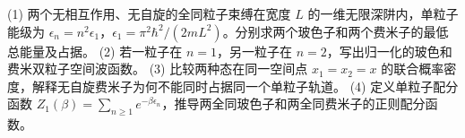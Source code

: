(1) 两个无相互作用、无自旋的全同粒子束缚在宽度 \(L\) 的一维无限深阱内，单粒子能级为 \(\epsilon_n=n^2\epsilon_1\)，\(\epsilon_1=\pi^2\hbar^2/(2mL^2)\)。分别求两个玻色子和两个费米子的最低总能量及占据。
(2) 若一粒子在 \(n=1\)，另一粒子在 \(n=2\)，写出归一化的玻色和费米双粒子空间波函数。
(3) 比较两种态在同一空间点 \(x_1=x_2=x\) 的联合概率密度，解释无自旋费米子为何不能同时占据同一个单粒子轨道。
(4) 定义单粒子配分函数 \(Z_1(\beta)=\sum_{n\ge1}e^{-\beta\epsilon_n}\)，推导两全同玻色子和两全同费米子的正则配分函数。
